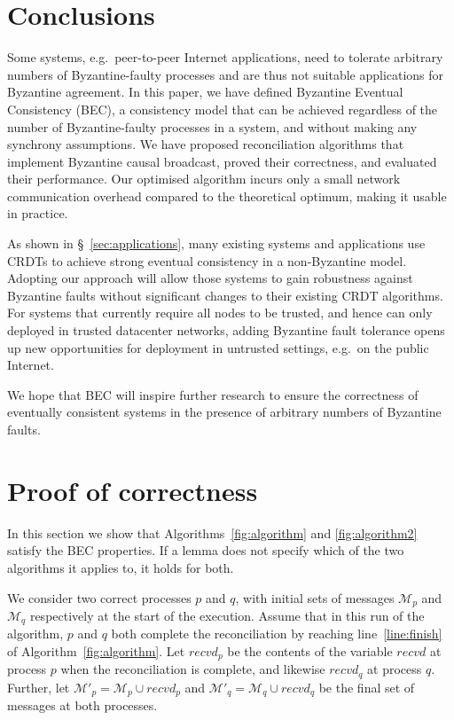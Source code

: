 \documentclass[a4paper,anonymous,USenglish]{lipics-v2019}
\begin{document}
\section{Conclusions}

Some systems, e.g.\ peer-to-peer Internet applications, need to tolerate arbitrary numbers of Byzantine-faulty processes and are thus not suitable applications for Byzantine agreement.
In this paper, we have defined Byzantine Eventual Consistency (BEC), a consistency model that can be achieved regardless of the number of Byzantine-faulty processes in a system, and without making any synchrony assumptions.
We have proposed reconciliation algorithms that implement Byzantine causal broadcast, proved their correctness, and evaluated their performance.
Our optimised algorithm incurs only a small network communication overhead compared to the theoretical optimum, making it usable in practice.

As shown in \S~\ref{sec:applications}, many existing systems and applications use CRDTs to achieve strong eventual consistency in a non-Byzantine model.
Adopting our approach will allow those systems to gain robustness against Byzantine faults without significant changes to their existing CRDT algorithms.
For systems that currently require all nodes to be trusted, and hence can only deployed in trusted datacenter networks, adding Byzantine fault tolerance opens up new opportunities for deployment in untrusted settings, e.g.\ on the public Internet.

We hope that BEC will inspire further research to ensure the correctness of eventually consistent systems in the presence of arbitrary numbers of Byzantine faults.



\appendix

\section{Proof of correctness}\label{sec:proof}

In this section we show that Algorithms~\ref{fig:algorithm} and \ref{fig:algorithm2} satisfy the BEC properties.
If a lemma does not specify which of the two algorithms it applies to, it holds for both.

We consider two correct processes $p$ and $q$, with initial sets of messages $\mathcal{M}_p$ and $\mathcal{M}_q$ respectively at the start of the execution.
Assume that in this run of the algorithm, $p$ and $q$ both complete the reconciliation by reaching line~\ref{line:finish} of Algorithm~\ref{fig:algorithm}.
Let $\mathit{recvd}_p$ be the contents of the variable $\mathit{recvd}$ at process $p$ when the reconciliation is complete, and likewise $\mathit{recvd}_q$ at process $q$.
Further, let $\mathcal{M}'_p = \mathcal{M}_p \cup \mathit{recvd}_p$ and $\mathcal{M}'_q = \mathcal{M}_q \cup \mathit{recvd}_q$ be the final set of messages at both processes.
\end{document}

